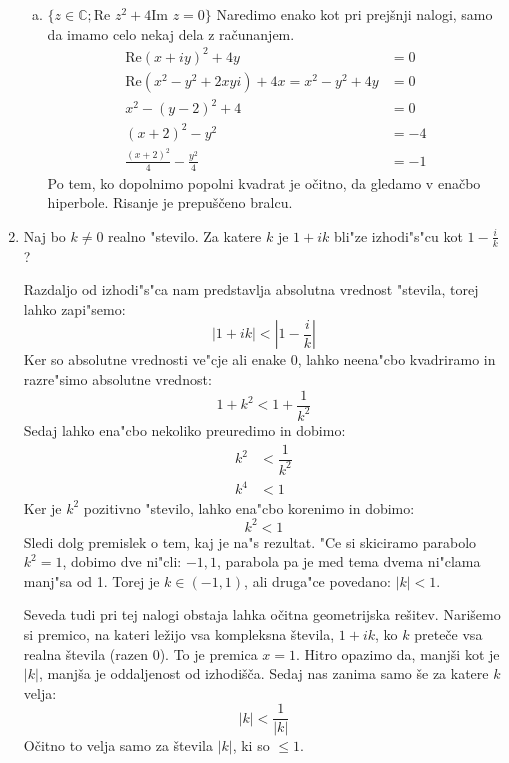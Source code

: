 \documentclass[12pt,a4paper,slovene]{article}
\begin{document}
\begin{enumerate}[(1)]
\begin{enumerate}[(a)]
        \item $\{ z \in \mathbb{C}; \text{Re }z^2 + 4 \text{Im }z = 0 \}$
        Naredimo enako kot pri prejšnji nalogi, samo da imamo celo nekaj dela z računanjem.
        \begin{align*}
            \text{Re}(x + iy)^2 + 4y &= 0\\
            \text{Re}(x^2 - y^2 + 2xyi) + 4x = x^2 - y^2 + 4y &= 0\\
            x^2 - (y - 2)^2 + 4 &= 0\\
            (x + 2)^2 - y^2 &= -4\\
            \frac{(x+2)^2}{4} - \frac{y^2}{4} &= -1
        \end{align*}
        Po tem, ko dopolnimo popolni kvadrat je očitno, da gledamo v enačbo hiperbole. Risanje je prepuščeno bralcu.
    \end{enumerate}
	
	\item Naj bo $k \neq 0$ realno "stevilo. Za katere $k$ je $1 + ik$ bli"ze izhodi"s"cu kot $1-\frac{i}{k}$?
	
	Razdaljo od izhodi"s"ca nam predstavlja absolutna vrednost "stevila, torej lahko zapi"semo:
	\begin{equation*}
	|1+ik| < \left|1-\dfrac{i}{k}\right|
	\end{equation*}
	Ker so absolutne vrednosti ve"cje ali enake 0, lahko neena"cbo kvadriramo in razre"simo absolutne vrednost:
	\begin{equation*}
	1 + k^2 < 1 + \dfrac{1}{k^2}
	\end{equation*}
	Sedaj lahko ena"cbo nekoliko preuredimo in dobimo:
	\begin{align*}
	k^2 &< \dfrac{1}{k^2}\\
	k^4 &< 1
	\end{align*}
	Ker je $k^2$ pozitivno "stevilo, lahko ena"cbo korenimo in dobimo:
	\begin{equation*}
	k^2 < 1
	\end{equation*}
	Sledi dolg premislek o tem, kaj je na"s rezultat. "Ce si skiciramo parabolo $k^2 = 1$, dobimo dve ni"cli: $-1, 1$, parabola pa je med tema dvema ni"clama manj"sa od 1. Torej je $k \in (-1, 1)$, ali druga"ce povedano: $|k| < 1$.
    
    Seveda tudi pri tej nalogi obstaja lahka očitna geometrijska rešitev. Narišemo si premico, na kateri ležijo vsa kompleksna števila, $1 + ik$, ko $k$ preteče vsa realna števila (razen 0). To je premica $x = 1$. Hitro opazimo da, manjši kot je $|k|$, manjša je oddaljenost od izhodišča. Sedaj nas zanima samo še za katere $k$ velja:
    \[
    |k| < \frac{1}{|k|}
    \]
    Očitno to velja samo za števila $|k|$, ki so $\leq 1$.


\end{enumerate}
\end{document}
